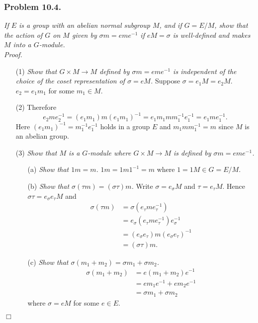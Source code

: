 \documentclass{article}
\begin{document}



\subsubsection*{Problem 10.4.}
\emph{If $E$ is a group with an abelian normal subgroup $M$,
and if $G = E/M$,
show that the action of $G$ on $M$ given by $\sigma m = eme^{-1}$ if
$eM = \sigma$ is well-defined and makes $M$ into a $G$-module.} \\



\emph{Proof.}
\begin{enumerate}
\item[(1)]
  \emph{Show that $G \times M \to M$ defined by $\sigma m = eme^{-1}$
  is independent of the choice of the coset representation of $\sigma = eM$.}
  Suppose $\sigma = e_1 M = e_2 M$.
  $e_2 = e_1 m_1$ for some $m_1 \in M$.

\item[(2)]
  Therefore
  \[
    e_2 m e_2^{-1}
    = (e_1 m_1)m(e_1 m_1)^{-1}
    = e_1 m_1 m m_1^{-1} e_1^{-1}
    = e_1 m e_1^{-1}.
  \]
  Here $(e_1 m_1)^{-1} = m_1^{-1} e_1^{-1}$ holds in a group $E$
  and $m_1 m m_1^{-1} = m$ since $M$ is an abelian group.

\item[(3)]
  \emph{Show that $M$ is a $G$-module where
  $G \times M \to M$ is defined by $\sigma m = eme^{-1}$.}
  \begin{enumerate}
  \item[(a)]
    \emph{Show that $1m = m$.}
    $1m = 1m1^{-1} = m$ where $1 = 1M \in G = E/M$.
    
  \item[(b)]
    \emph{Show that $\sigma(\tau m) = (\sigma\tau) m$.}
    Write $\sigma = e_{\sigma} M$ and $\tau = e_{\tau} M$.
    Hence $\sigma \tau = e_{\sigma} e_{\tau} M$
    and
    \begin{align*}
      \sigma(\tau m)
      &= \sigma(e_{\tau} m e_{\tau}^{-1}) \\
      &= e_{\sigma}(e_{\tau} m e_{\tau}^{-1})e_{\sigma}^{-1} \\
      &= (e_{\sigma}e_{\tau}) m (e_{\sigma}e_{\tau})^{-1} \\
      &= (\sigma \tau)m.
    \end{align*}

  \item[(c)]
    \emph{Show that $\sigma(m_1 + m_2) = \sigma m_1 + \sigma m_2$.}
    \begin{align*}
      \sigma (m_1 + m_2)
      &= e(m_1 + m_2)e^{-1} \\
      &= em_1e^{-1} + em_2e^{-1} \\
      &= \sigma m_1 + \sigma m_2
    \end{align*}
    where $\sigma = eM$ for some $e \in E$.
  \end{enumerate}
\end{enumerate}
$\Box$ \\\\
\end{document}
